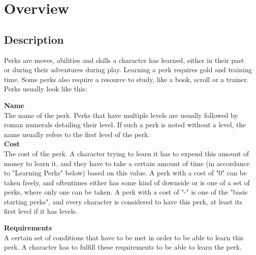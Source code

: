 \chapter{Overview}
\section{Description}
Perks are moves, abilities and skills a character has learned, either in their past or during their adventures during play. Learning a perk requires gold and training time. Some perks also require a resource to study, like a book, scroll or a trainer. Perks usually look like this:

\textbf{Name}\\
The name of the perk. Perks that have multiple levels are usually followed by roman numerals detailing their level. If such a perk is noted without a level, the name usually refers to the first level of the perk.\\

\textbf{Cost}\\
The cost of the perk. A character trying to learn it has to expend this amount of money to learn it, and they have to take a certain amount of time (in accordance to "Learning Perks" below) based on this value. A perk with a cost of "0" can be taken freely, and oftentimes either has some kind of downside or is one of a set of perks, where only one can be taken. A perk with a cost of "-" is one of the "basic starting perks", and every character is considered to have this perk, at least its first level if it has levels.

\textbf{Requirements}\\
A certain set of conditions that have to be met in order to be able to learn this perk. A character has to fulfill these requirements to be able to learn the perk.

